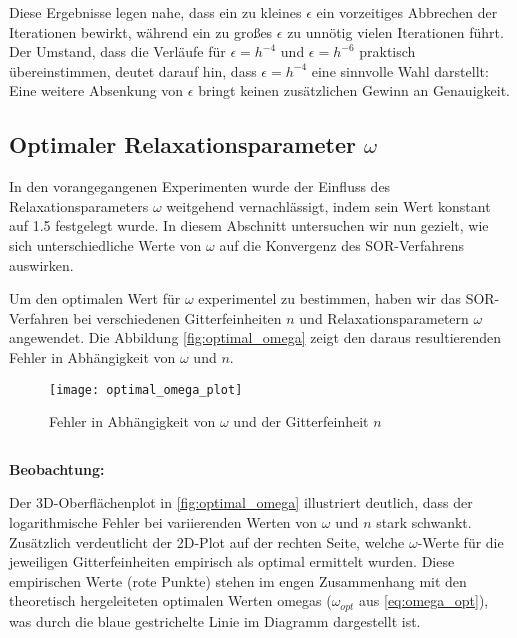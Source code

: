 \documentclass{scrartcl}
\newenvironment{code}{\captionsetup{type=listing}}{}
\begin{document}
Diese Ergebnisse legen nahe, dass ein zu kleines \(\epsilon\) ein vorzeitiges
Abbrechen der Iterationen bewirkt, während ein zu großes \(\epsilon\) zu
unnötig vielen Iterationen führt. Der Umstand, dass die Verläufe für \(\epsilon
= h^{-4}\) und \(\epsilon = h^{-6}\) praktisch übereinstimmen, deutet darauf
hin, dass \(\epsilon = h^{-4}\) eine sinnvolle Wahl darstellt: Eine weitere
Absenkung von \(\epsilon\) bringt keinen zusätzlichen Gewinn an Genauigkeit.

\subsection{Optimaler Relaxationsparameter \(\omega\)}

In den vorangegangenen Experimenten wurde der Einfluss des
Relaxationsparameters \(\omega\) weitgehend vernachlässigt, indem sein Wert
konstant auf 1.5 festgelegt wurde. In diesem Abschnitt untersuchen wir nun
gezielt, wie sich unterschiedliche Werte von \(\omega\) auf die Konvergenz des
SOR-Verfahrens auswirken.

Um den optimalen Wert für \(\omega\) experimentel zu bestimmen, haben wir das
SOR-Verfahren bei verschiedenen Gitterfeinheiten \(n\) und
Relaxationsparametern \(\omega\) angewendet. Die Abbildung
\autoref{fig:optimal_omega} zeigt den daraus resultierenden Fehler in
Abhängigkeit von \(\omega\) und \(n\).

\begin{figure}[H]
    \centering
    \texttt{[image: optimal\_omega\_plot]}
    \caption{Fehler in Abhängigkeit von \(\omega\) und der Gitterfeinheit \(n\)}
    \label{fig:optimal_omega}
\end{figure}

\begin{code}
    \label{code:optimal_omega}
    \inputminted[firstline=26, lastline=30]{bash}{figures/generate.sh}
\end{code}

\textbf{Beobachtung:}

Der 3D-Oberflächenplot in \autoref{fig:optimal_omega} illustriert deutlich,
dass der logarithmische Fehler bei variierenden Werten von \(\omega\) und \(n\)
stark schwankt. Zusätzlich verdeutlicht der 2D-Plot auf der rechten Seite,
welche \(\omega\)-Werte für die jeweiligen Gitterfeinheiten empirisch als
optimal ermittelt wurden. Diese empirischen Werte (rote Punkte) stehen im engen
Zusammenhang mit den theoretisch hergeleiteten optimalen Werten omegas
(\(\omega_{opt}\) aus \autoref{eq:omega_opt}), was durch die blaue gestrichelte
Linie im Diagramm dargestellt ist.
\end{document}
